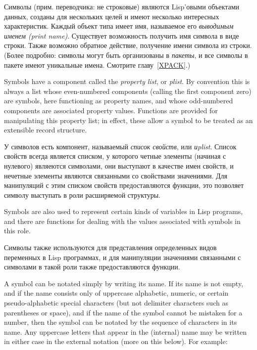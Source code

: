 Символы (прим. переводчика: не строковые) являются Lisp'овыми объектами данных,
созданы для нескольких целей и имеют несколько интересных характеристик. Каждый
объект типа  имеет имя, называемое его \emph{выводимым именем (print
  name)}. Существует возможность получить имя символа в виде строки. Также
возможно обратное действие, получение имени символа из строки. (Более подробно:
символы могут быть организованы в \emph{пакеты}, и все символы в пакете имеют
уникальные имена. Смотрите главу~\ref{XPACK}.)

Symbols have a component called the \emph{property list}, or \emph{plist}.
By convention this is always a list whose even-numbered
components (calling the first component zero) are symbols,
here functioning as property names, and whose odd-numbered components
are associated property values.  Functions are provided for manipulating
this property list; in effect, these allow a symbol to be treated as an
extensible record structure.

У символов есть компонент, называемый \emph{список свойств}, или \emph{иplist}.
Список свойств всегда является списком, у которого четные элементы (начиная с
нулевого) являеются символами, они выступают в качестве имен свойств, и нечетные
элементы являются связанными со свойствами значениями. Для манипуляций с этим
списком свойств предоставляются функции, это позволяет символу выступать в роли расширяемой структуры.

Symbols are also used to represent certain kinds of variables in Lisp
programs, and there are functions for dealing with the values associated
with symbols in this role. 

Символы также используются для представления определенных видов переменных в
Lisp программах, и для манипуляции значениями связанными с символами в такой
роли также предоставляются функции.

A symbol can be notated simply by writing its name.
If its name is not empty, and if the name consists only of
uppercase alphabetic, numeric, or certain pseudo-alphabetic
special characters (but not
delimiter characters such as parentheses or space), and if
the name of the symbol cannot be mistaken for a number, then
the symbol can be notated by the sequence of characters in its name.
Any uppercase letters that appear in the (internal) name may
be written in either case in the external notation (more on this below).
For example:

